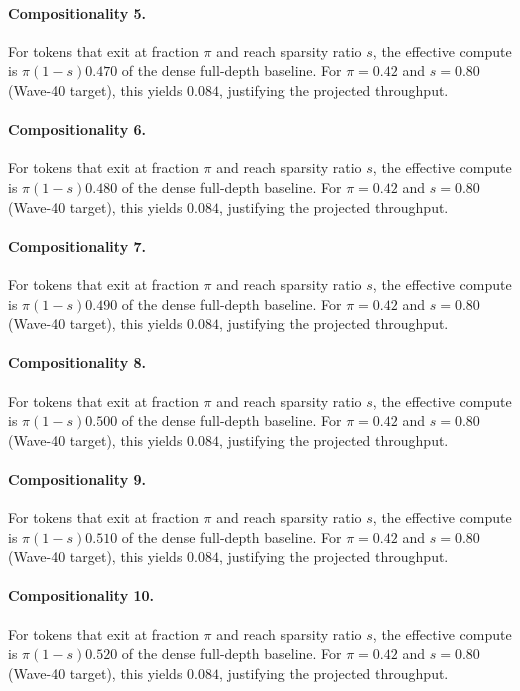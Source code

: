 \paragraph{Compositionality 5.}
For tokens that exit at fraction $\pi$ and reach sparsity ratio $s$, the
effective compute is $\pi(1-s)0.470$ of the dense full-depth
baseline. For $\pi = 0.42$ and $s = 0.80$ (Wave-40 target), this yields
$0.084$, justifying the projected throughput.

\paragraph{Compositionality 6.}
For tokens that exit at fraction $\pi$ and reach sparsity ratio $s$, the
effective compute is $\pi(1-s)0.480$ of the dense full-depth
baseline. For $\pi = 0.42$ and $s = 0.80$ (Wave-40 target), this yields
$0.084$, justifying the projected throughput.

\paragraph{Compositionality 7.}
For tokens that exit at fraction $\pi$ and reach sparsity ratio $s$, the
effective compute is $\pi(1-s)0.490$ of the dense full-depth
baseline. For $\pi = 0.42$ and $s = 0.80$ (Wave-40 target), this yields
$0.084$, justifying the projected throughput.

\paragraph{Compositionality 8.}
For tokens that exit at fraction $\pi$ and reach sparsity ratio $s$, the
effective compute is $\pi(1-s)0.500$ of the dense full-depth
baseline. For $\pi = 0.42$ and $s = 0.80$ (Wave-40 target), this yields
$0.084$, justifying the projected throughput.

\paragraph{Compositionality 9.}
For tokens that exit at fraction $\pi$ and reach sparsity ratio $s$, the
effective compute is $\pi(1-s)0.510$ of the dense full-depth
baseline. For $\pi = 0.42$ and $s = 0.80$ (Wave-40 target), this yields
$0.084$, justifying the projected throughput.

\paragraph{Compositionality 10.}
For tokens that exit at fraction $\pi$ and reach sparsity ratio $s$, the
effective compute is $\pi(1-s)0.520$ of the dense full-depth
baseline. For $\pi = 0.42$ and $s = 0.80$ (Wave-40 target), this yields
$0.084$, justifying the projected throughput.

